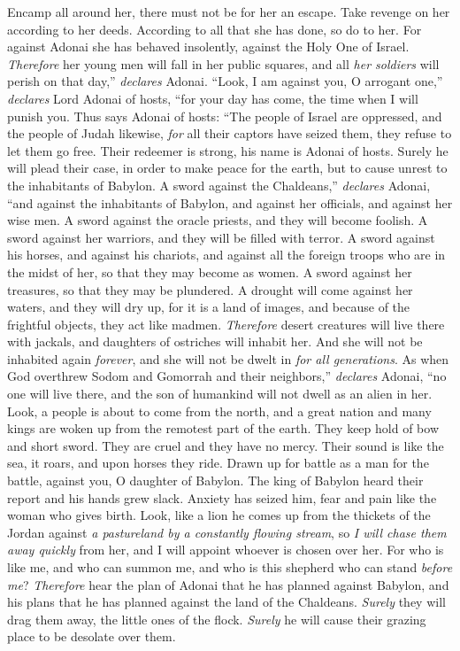 \begin{biblechapter}
Encamp all around her, 
there must not be for her an escape. 
Take revenge on her according to her deeds. 
According to all that she has done, so do to her. 
For against Adonai she has behaved insolently, 
against the Holy One of Israel.
\verse \textit{Therefore} her young men will fall in her public squares, 
and all \textit{her soldiers} will perish on that day,” \textit{declares} Adonai.
\verse “Look, I am against you, O arrogant one,” 
\textit{declares} Lord Adonai of hosts, 
“for your day has come, 
the time when I will punish you.
\verse Thus says Adonai of hosts:
\verse “The people of Israel are oppressed, 
and the people of Judah likewise, 
\textit{for} all their captors have seized them, 
they refuse to let them go free.
\verse Their redeemer is strong, 
his name is Adonai of hosts. 
Surely he will plead their case, 
in order to make peace for the earth, 
but to cause unrest to the inhabitants of Babylon.
\verse A sword against the Chaldeans,” \textit{declares} Adonai, 
“and against the inhabitants of Babylon, 
and against her officials, 
and against her wise men.
\verse A sword against the oracle priests, 
and they will become foolish. 
A sword against her warriors, 
and they will be filled with terror.
\verse A sword against his horses, 
and against his chariots, 
and against all the foreign troops who are in the midst of her, 
so that they may become as women. 
A sword against her treasures, 
so that they may be plundered.
\verse A drought will come against her waters, 
and they will dry up, 
for it is a land of images, 
and because of the frightful objects, they act like madmen.
\verse \textit{Therefore} desert creatures will live there with jackals, 
and daughters of ostriches will inhabit her. 
And she will not be inhabited again \textit{forever}, 
and she will not be dwelt in \textit{for all generations}.
\verse As when God overthrew Sodom and Gomorrah 
and their neighbors,” \textit{declares} Adonai, 
“no one will live there, 
and the son of humankind will not dwell as an alien in her.
\verse Look, a people is about to come 
from the north, 
and a great nation and many kings are woken up 
from the remotest part of the earth.
\verse They keep hold of bow and short sword. 
They are cruel and they have no mercy. 
Their sound is like the sea, it roars, 
and upon horses they ride. 
Drawn up for battle as a man for the battle, 
against you, O daughter of Babylon.
\verse The king of Babylon heard their report 
and his hands grew slack. 
Anxiety has seized him, 
fear and pain like the woman who gives birth.
\verse Look, like a lion he comes up from the thickets of the Jordan 
against \textit{a pastureland by a constantly flowing stream}, 
so \textit{I will chase them away quickly} from her, 
and I will appoint whoever is chosen over her. 
For who is like me, and who can summon me, 
and who is this shepherd who can stand \textit{before me}?
\verse \textit{Therefore} hear the plan of Adonai 
that he has planned against Babylon, 
and his plans 
that he has planned against the land of the Chaldeans. 
\textit{Surely} they will drag them away, 
the little ones of the flock. 
\textit{Surely} he will cause their grazing place 
to be desolate over them.
\end{biblechapter}

